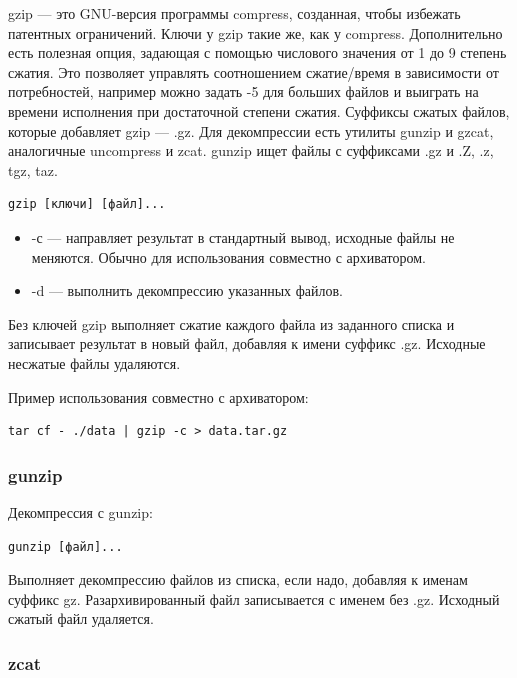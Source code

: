 \documentclass[14pt, a4paper]{article}
\begin{document}
gzip — это GNU-версия программы compress, созданная, чтобы избежать патентных
ограничений. Ключи у gzip такие же, как у compress. Дополнительно есть полезная опция, задающая с
помощью числового значения от 1 до 9 степень сжатия. Это позволяет управлять соотношением
сжатие/время в зависимости от потребностей, например можно задать -5 для больших файлов и
выиграть на времени исполнения при достаточной степени сжатия. Суффиксы сжатых файлов,
которые добавляет gzip — .gz. Для декомпрессии есть утилиты gunzip и gzcat, аналогичные
uncompress и zcat. gunzip ищет файлы с суффиксами .gz и .Z, .z, tgz, taz.

\begin{lstlisting}
gzip [ключи] [файл]...
\end{lstlisting}

\begin{itemize}
    \item -с — направляет результат в стандартный вывод, исходные файлы не меняются. Обычно для
    использования совместно с архиватором.
    \item -d — выполнить декомпрессию указанных файлов.
\end{itemize}

Без ключей gzip выполняет сжатие каждого файла из заданного списка и записывает результат
в новый файл, добавляя к имени суффикс .gz. Исходные несжатые файлы удаляются.

Пример использования совместно с архиватором:

\begin{lstlisting}
tar cf - ./data | gzip -c > data.tar.gz
\end{lstlisting}
    


\subsubsection*{gunzip}

Декомпрессия с gunzip:

\begin{lstlisting}
gunzip [файл]...
\end{lstlisting}

Выполняет декомпрессию файлов из списка, если надо, добавляя к именам суффикс gz.
Разархивированный файл записывается с именем без .gz. Исходный сжатый файл удаляется.



\subsubsection*{zcat}
\end{document}
